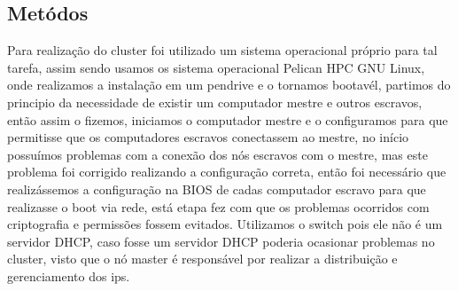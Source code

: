 \documentclass[12pt]{article}
\begin{document}
\begin{table}[]
\centering
\label{tab:computersLabor}
\caption{Configuração das máquinas utilizadas no cluster}
\end{table}


\subsection{Metódos}
    Para realização do cluster foi utilizado um sistema operacional próprio para tal tarefa, 
    assim sendo usamos os sistema operacional Pelican HPC GNU Linux, onde realizamos a instalação
    em um pendrive e o tornamos bootavél, partimos do principio da necessidade de existir um computador
    mestre e outros escravos, então assim o fizemos, iniciamos o computador mestre e o configuramos para que
    permitisse que os computadores escravos conectassem ao mestre, no início possuímos problemas com a conexão dos 
    nós escravos com o mestre, mas este problema foi corrigido realizando a configuração correta, então foi necessário 
    que realizássemos a configuração na BIOS de cadas computador escravo para que realizasse o boot via rede, está etapa fez com que 
    os problemas ocorridos com criptografia e permissões fossem evitados. Utilizamos o switch pois ele não é um servidor DHCP, caso
    fosse um servidor DHCP poderia ocasionar problemas no cluster, visto que o nó master é responsável por realizar a distribuição e gerenciamento dos ips.
   
\end{document}
